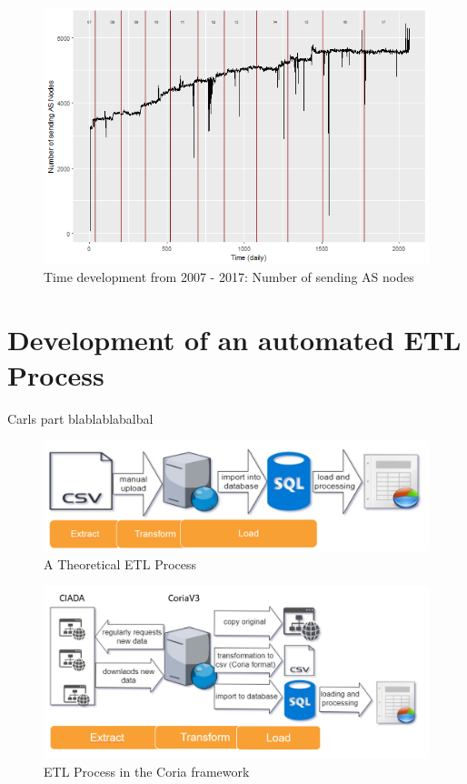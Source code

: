 \documentclass[conference]{IEEEtran}
\begin{document}
\begin{figure}[htbp]
\centerline{\includegraphics[scale=0.4]{Graphics/ASFromAll.png}}
\caption{Time development from 2007 - 2017: Number of sending AS nodes}
\label{fig}
\end{figure}


\section{Development of an automated ETL Process}

Carls part blablablabalbal



\begin{figure}[htbp]
\centerline{\includegraphics[scale=0.29]{Graphics/ETL1.PNG}}
\caption{A Theoretical ETL Process}
\label{fig}
\end{figure}

\begin{figure}[htbp]
\centerline{\includegraphics[scale=0.4]{Graphics/ETL2.PNG}}
\caption{ETL Process in the Coria framework}
\label{fig}
\end{figure}
\end{document}
